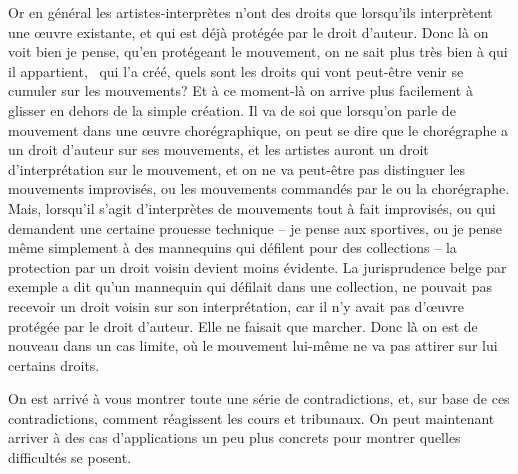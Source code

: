 {Or en g\'en\'eral les artistes{}-interpr\`etes n'ont des droits que
lorsqu'ils interpr\`etent une {\oe}uvre existante, et qui est d\'ej\`a
prot\'eg\'ee par le droit d'auteur. Donc l\`a on voit bien je pense,
qu'en prot\'egeant le mouvement, on ne sait plus tr\`es bien \`a qui il
appartient, \ qui l'a cr\'e\'e, quels sont les droits qui vont
peut{}-\^etre venir se cumuler sur les mouvements? Et \`a ce
moment{}-l\`a on arrive plus facilement \`a glisser en dehors de la
simple cr\'eation. Il va de soi que lorsqu'on parle de mouvement dans
une {\oe}uvre chor\'egraphique, on peut se dire que le chor\'egraphe a
un droit d'auteur sur ses mouvements, et les artistes auront un droit
d'interpr\'etation sur le mouvement, et on ne va peut{}-\^etre pas
distinguer les mouvements improvis\'es, ou les mouvements command\'es
par le ou la chor\'egraphe. Mais, lorsqu'il s'agit d'interpr\`etes de
mouvements tout \`a fait improvis\'es, ou qui demandent une certaine
prouesse technique {--} je pense aux sportives, ou je pense m\^eme
simplement \`a des mannequins qui d\'efilent pour des collections {--}
la protection par un droit voisin devient moins \'evidente. La
jurisprudence belge par exemple a dit qu'un mannequin qui d\'efilait
dans une collection, ne pouvait pas recevoir un droit voisin sur son
interpr\'etation, car il n'y avait pas d'{\oe}uvre prot\'eg\'ee par le
droit d'auteur. Elle ne faisait que marcher. Donc l\`a on est de
nouveau dans un cas limite, o\`u le mouvement lui{}-m\^eme ne va pas
attirer sur lui certains droits.\par

On est arriv\'e \`a vous montrer toute une s\'erie de contradictions,
et, sur base de ces contradictions, comment r\'eagissent les cours et
tribunaux. On peut maintenant arriver \`a des cas d'applications un peu
plus concrets pour montrer quelles difficult\'es se posent.\par

}
